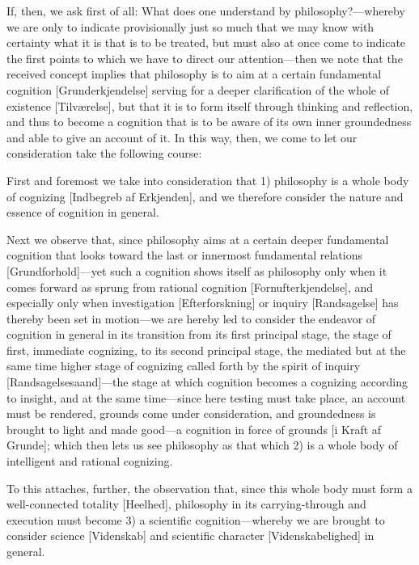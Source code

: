 \documentclass[12pt,a4paper]{book}
\begin{document}
If, then, we ask first of all: What does one understand by philosophy?---whereby
we are only to indicate provisionally just so much that we may know with
certainty what it is that is to be treated, but must also at once come to
indicate the first points to which we have to direct our attention---then we note
that the received concept implies that philosophy is to aim at a certain
fundamental cognition [Grunderkjendelse] serving for a deeper clarification of
the whole of existence [Tilværelse], but that it is to form itself through
thinking and reflection, and thus to become a cognition that is to be aware of
its own inner groundedness and able to give an account of it. In this way, then,
we come to let our consideration take the following course:

First and foremost we take into consideration that 1) philosophy is a whole body
of cognizing [Indbegreb af Erkjenden], and we therefore consider the nature and
essence of cognition in general.

Next we observe that, since philosophy aims at a certain deeper fundamental
cognition that looks toward the last or innermost fundamental relations
[Grundforhold]---yet such a cognition shows itself as philosophy only when it
comes forward as sprung from rational cognition [Fornufterkjendelse], and
especially only when investigation [Efterforskning] or inquiry [Randsagelse] has
thereby been set in motion---we are hereby led to consider the endeavor of
cognition in general in its transition from its first principal stage, the stage
of first, immediate cognizing, to its second principal stage, the mediated but at
the same time higher stage of cognizing called forth by the spirit of inquiry
[Randsagelsesaand]---the stage at which cognition becomes a cognizing according
to insight, and at the same time---since here testing must take place, an account
must be rendered, grounds come under consideration, and groundedness is brought
to light and made good---a cognition in force of grounds [i Kraft af Grunde];
which then lets us see philosophy as that which 2) is a whole body of intelligent
and rational cognizing.

To this attaches, further, the observation that, since this whole body must form
a well-connected totality [Heelhed], philosophy in its carrying-through and
execution must become 3) a scientific cognition---whereby we are brought to
consider science [Videnskab] and scientific character [Videnskabelighed] in
general.
\end{document}
